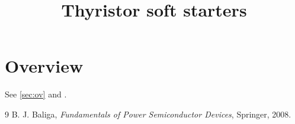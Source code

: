 \documentclass{article}
\title{Thyristor soft starters}
\begin{document}
\maketitle
\section{Overview}\label{sec:ov}
See \autoref{sec:ov} and \cite{baliga}.
\begin{thebibliography}{9}
 B. J. Baliga, \emph{Fundamentals of Power Semiconductor Devices}, Springer, 2008.
\end{thebibliography}
\end{document}
